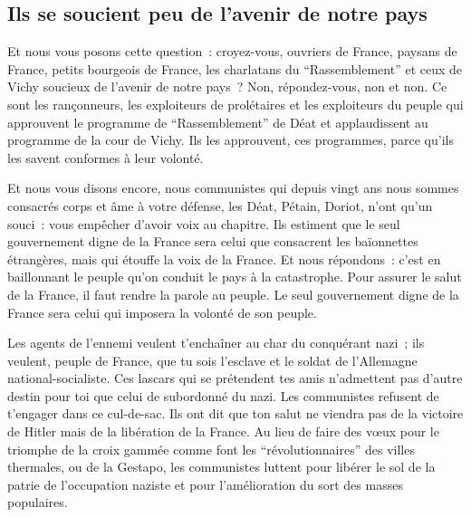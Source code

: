 \documentclass[french,twoside]{book} %
\begin{document}
\subsection[Ils se soucient peu de l’avenir de notre pays]{Ils se soucient peu de l’avenir de notre pays}
\noindent Et nous vous posons cette question : croyez-vous, ouvriers de France, paysans de France, petits bourgeois de France, les charlatans du “Rassemblement” et ceux de Vichy soucieux de l’avenir de notre pays ? Non, répondez-vous, non et non. Ce sont les rançonneurs, les exploiteurs de prolétaires et les exploiteurs du peuple qui approuvent le programme de “Rassemblement” de Déat et applaudissent au programme de la cour de Vichy. Ils les approuvent, ces programmes, parce qu’ils les savent conformes à leur volonté.\par
Et nous vous disons encore, nous communistes qui depuis vingt ans nous sommes consacrés corps et âme à votre défense, les Déat, Pétain, Doriot, n’ont qu’un souci : vous empêcher d’avoir voix au chapitre. Ils estiment que le seul gouvernement digne de la France sera celui que consacrent les baïonnettes étrangères, mais qui étouffe la voix de la France. Et nous répondons : c’est en baillonnant le peuple qu’on conduit le pays à la catastrophe. Pour assurer le salut de la France, il faut rendre la parole au peuple. Le seul gouvernement digne de la France sera celui qui imposera la volonté de son peuple.\par
Les agents de l’ennemi veulent t’enchaîner au char du conquérant nazi ; ils veulent, peuple de France, que tu sois l’esclave et le soldat de l’Allemagne national-socialiste. Ces lascars qui se prétendent tes amis n’admettent pas d’autre destin pour toi que celui de subordonné du nazi. Les communistes refusent de t’engager dans ce cul-de-sac. Ils ont dit que ton salut ne viendra pas de la victoire de Hitler mais de la libération de la France. Au lieu de faire des vœux pour le triomphe de la croix gammée comme font les “révolutionnaires” des villes thermales, ou de la Gestapo, les communistes luttent pour libérer le sol de la patrie de l’occupation naziste et pour l’amélioration du sort des masses populaires.
\end{document}
